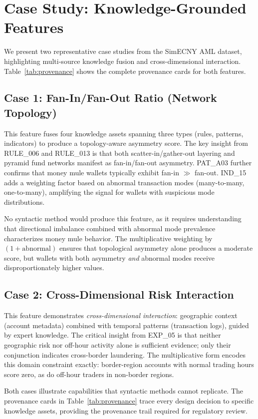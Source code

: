 \section{Case Study: Knowledge-Grounded Features}
\label{sec:case_study}

We present two representative case studies from the SimECNY AML dataset, highlighting multi-source knowledge fusion and cross-dimensional interaction. Table~\ref{tab:provenance} shows the complete provenance cards for both features.

\subsection{Case 1: Fan-In/Fan-Out Ratio (Network Topology)}

This feature fuses four knowledge assets spanning three types (rules, patterns, indicators) to produce a topology-aware asymmetry score. The key insight from RULE\_006 and RULE\_013 is that both scatter-in/gather-out layering and pyramid fund networks manifest as fan-in/fan-out asymmetry. PAT\_A03 further confirms that money mule wallets typically exhibit fan-in $\gg$ fan-out. IND\_15 adds a weighting factor based on abnormal transaction modes (many-to-many, one-to-many), amplifying the signal for wallets with suspicious mode distributions.

No syntactic method would produce this feature, as it requires understanding that directional imbalance combined with abnormal mode prevalence characterizes money mule behavior. The multiplicative weighting by $(1 + \text{abnormal})$ ensures that topological asymmetry alone produces a moderate score, but wallets with both asymmetry \emph{and} abnormal modes receive disproportionately higher values.

\subsection{Case 2: Cross-Dimensional Risk Interaction}

This feature demonstrates \emph{cross-dimensional interaction}: geographic context (account metadata) combined with temporal patterns (transaction logs), guided by expert knowledge. The critical insight from EXP\_05 is that neither geographic risk nor off-hour activity alone is sufficient evidence; only their conjunction indicates cross-border laundering. The multiplicative form encodes this domain constraint exactly: border-region accounts with normal trading hours score zero, as do off-hour traders in non-border regions.

Both cases illustrate capabilities that syntactic methods cannot replicate. The provenance cards in Table~\ref{tab:provenance} trace every design decision to specific knowledge assets, providing the provenance trail required for regulatory review.
